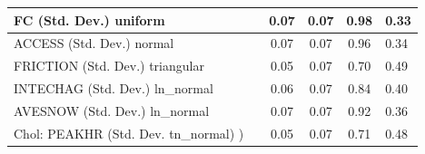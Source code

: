 \begin{table}
\begin{center}
\begin{tabular}{|l|l|c|c|c|l|}
			\hline
			FC (Std. Dev.) uniform &  & 0.07 & 0.07 & 0.98 & 0.33 \\
			\hline
			ACCESS (Std. Dev.) normal &  & 0.07 & 0.07 & 0.96 & 0.34 \\
			\hline
			FRICTION (Std. Dev.) triangular &  & 0.05 & 0.07 & 0.70 & 0.49 \\
			\hline
			INTECHAG (Std. Dev.) ln_normal &  & 0.06 & 0.07 & 0.84 & 0.40 \\
			\hline
			AVESNOW (Std. Dev.) ln_normal &  & 0.07 & 0.07 & 0.92 & 0.36 \\
			\hline
			 Chol: PEAKHR (Std. Dev. tn_normal) ) &  & 0.05 & 0.07 & 0.71 & 0.48 \\
			\hline
		\end{tabular}
	\end{center}
\end{table}